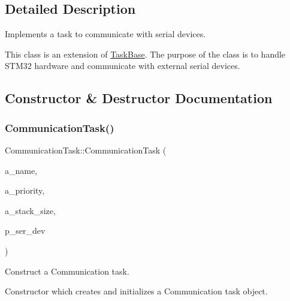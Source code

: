 \subsection{Detailed Description}
Implements a task to communicate with serial devices. 

This class is an extension of {\ttfamily \mbox{\hyperlink{class_task_base}{Task\+Base}}}. The purpose of the class is to handle S\+T\+M32 hardware and communicate with external serial devices. 

\subsection{Constructor \& Destructor Documentation}
\mbox{\label{class_communication_task_ac76f495e2350156d1faaa1a3198fe80f}} 
\subsubsection{\texorpdfstring{Communication\+Task()}{CommunicationTask()}}
{\footnotesize\ttfamily Communication\+Task\+::\+Communication\+Task (\begin{DoxyParamCaption}\item[{const char $\ast$}]{a\+\_\+name,  }\item[{unsigned port\+B\+A\+S\+E\+\_\+\+T\+Y\+PE}]{a\+\_\+priority,  }\item[{size\+\_\+t}]{a\+\_\+stack\+\_\+size,  }\item[{\mbox{\hyperlink{classemstream}{emstream}} $\ast$}]{p\+\_\+ser\+\_\+dev }\end{DoxyParamCaption})}



Construct a Communication task. 

Constructor which creates and initializes a Communication task object.

